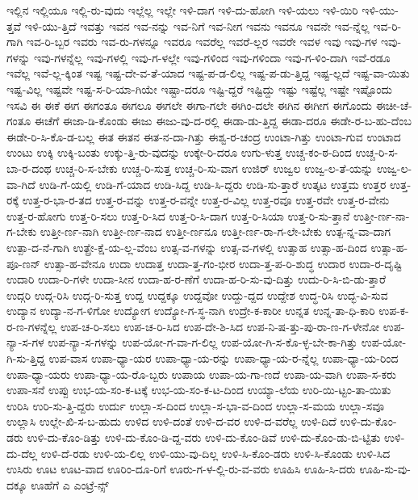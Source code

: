 {ಇಲ್ಲಿನ
ಇಲ್ಲಿಯೂ
ಇಲ್ಲಿ-ರು-ವುದು
ಇಲ್ಲೆಲ್ಲ
ಇಲ್ಲೇ
ಇಳಿ-ದಾಗ
ಇಳಿ-ದು-ಹೋಗಿ
ಇಳಿ-ಯಲು
ಇಳಿ-ಯಿರಿ
ಇಳಿ-ಯು-ತ್ತವೆ
ಇಳಿ-ಯು-ತ್ತಿದೆ
ಇವತ್ತು
ಇವನ
ಇವ-ನನ್ನು
ಇವ-ನಿಗೆ
ಇವ-ನೀಗ
ಇವನು
ಇವನೂ
ಇವನೇ
ಇವ-ನ್ನೆಲ್ಲ
ಇವ-ರಿ-ಗಾಗಿ
ಇವ-ರಿ-ಬ್ಬರ
ಇವರು
ಇವ-ರು-ಗಳನ್ನೂ
ಇವರೂ
ಇವರೆಲ್ಲ
ಇವರೆ-ಲ್ಲರ
ಇವರೇ
ಇವಳ
ಇವು
ಇವು-ಗಳ
ಇವು-ಗಳನ್ನು
ಇವು-ಗಳನ್ನೆಲ್ಲ
ಇವು-ಗಳಲ್ಲಿ
ಇವು-ಗ-ಳಲ್ಲೇ
ಇವು-ಗಳಿಂದ
ಇವು-ಗಳಿಂದಾ
ಇವು-ಗ-ಳಿಂ-ದಾಗಿ
ಇವೆ-ರಡೂ
ಇವೆಲ್ಲ
ಇವೆ-ಲ್ಲ-ಕ್ಕಿಂತ
ಇಷ್ಟ
ಇಷ್ಟ-ದೇ-ವ-ತೆ-ಯಾದ
ಇಷ್ಟ-ಪ-ಡ-ಲಿಲ್ಲ
ಇಷ್ಟ-ಪ-ಡು-ತ್ತಿದ್ದ
ಇಷ್ಟ-ಲ್ಲದೆ
ಇಷ್ಟ-ವಾ-ಯಿತು
ಇಷ್ಟ-ವಿಲ್ಲ
ಇಷ್ಟವೇ
ಇಷ್ಟ-ಸ-ರಿ-ಯಾ-ಗಿಯೇ
ಇಷ್ಟಾ-ದರೂ
ಇಷ್ಟಿ-ದ್ದರೆ
ಇಷ್ಟಿದ್ದು
ಇಷ್ಟು
ಇಷ್ಟೆಲ್ಲ
ಇಷ್ಟೇ
ಇಷ್ಟೊಂದು
ಇಸವಿ
ಈ
ಈಕೆ
ಈಗ
ಈಗಂತೂ
ಈಗಲೂ
ಈಗಲೇ
ಈಗಾ-ಗಲೇ
ಈಗಿಂ-ದಲೇ
ಈಗಿನ
ಈಗೀಗ
ಈಗೊಂದು
ಈಚೀ-ಚೆ-ಗಂತೂ
ಈಚೆಗೆ
ಈಜಾ-ಡಿ-ಕೊಂಡು
ಈಜು
ಈಜು-ವು-ದ-ರಲ್ಲಿ
ಈಡಾ-ಡು-ತ್ತಿದ್ದ
ಈಡಾ-ದರೂ
ಈಡೇ-ರ-ಬ-ಹು-ದೆಂಬ
ಈಡೇ-ರಿ-ಸಿ-ಕೊ-ಡ-ಬಲ್ಲ
ಈತ
ಈತನ
ಈತ-ನ-ದಾ-ಗಿತ್ತು
ಈಶ್ವ-ರ-ಚಂದ್ರ
ಉಂಟಾ-ಗಿತ್ತು
ಉಂಟಾ-ಗುವ
ಉಂಟಾದ
ಉಂಟು
ಉಕ್ಕಿ
ಉಕ್ಕಿ-ಬಂತು
ಉಕ್ಕು-ತ್ತಿ-ರು-ವುದನ್ನು
ಉಕ್ಕೇ-ರಿ-ದರೂ
ಉಗು-ಳುತ್ತ
ಉಚ್ಚ-ಕಂ-ಠ-ದಿಂದ
ಉಚ್ಚ-ರಿ-ಸ-ಬಾ-ರ-ದಂಥ
ಉಚ್ಚ-ರಿ-ಸ-ಬೇಕು
ಉಚ್ಚ-ರಿ-ಸುತ್ತ
ಉಚ್ಚ-ರಿ-ಸು-ವಾಗ
ಉಜಿರ್
ಉಜ್ವಲ
ಉಜ್ವ-ಲ-ತೆ-ಯನ್ನು
ಉಜ್ವ-ಲ-ವಾ-ಗಿದೆ
ಉಡಿ-ಗೆ-ಯಲ್ಲಿ
ಉಡಿ-ಗೆ-ಯಾದ
ಉಡಿ-ಸಿದ್ದ
ಉಡಿ-ಸಿ-ದ್ದರು
ಉಡಿ-ಸು-ತ್ತಾರೆ
ಉತ್ಕಟ
ಉತ್ತಮ
ಉತ್ತರ
ಉತ್ತ-ರಕ್ಕೆ
ಉತ್ತ-ರ-ಭಾ-ರ-ತದ
ಉತ್ತ-ರ-ವನ್ನು
ಉತ್ತ-ರ-ವನ್ನೇ
ಉತ್ತ-ರ-ವಿಲ್ಲ
ಉತ್ತ-ರವೂ
ಉತ್ತ-ರವೇ
ಉತ್ತ-ರ-ವೇನು
ಉತ್ತ-ರ-ಹೋಗು
ಉತ್ತ-ರಿ-ಸಲು
ಉತ್ತ-ರಿ-ಸಿದ
ಉತ್ತ-ರಿ-ಸಿ-ದಾಗ
ಉತ್ತ-ರಿ-ಸಿಯಾ
ಉತ್ತ-ರಿ-ಸು-ತ್ತಾನೆ
ಉತ್ತೀ-ರ್ಣ-ನಾ-ಗ-ಬೇಕು
ಉತ್ತೀ-ರ್ಣ-ನಾಗಿ
ಉತ್ತೀ-ರ್ಣ-ನಾದ
ಉತ್ತೀ-ರ್ಣನೂ
ಉತ್ತೀ-ರ್ಣ-ರಾ-ಗ-ಲೇ-ಬೇಕು
ಉತ್ಪ-ನ್ನ-ವಾ-ದಾಗ
ಉತ್ಪಾ-ದ-ನೆ-ಗಾಗಿ
ಉತ್ಪ್ರೇ-ಕ್ಷೆ-ಯ-ಲ್ಲ-ವೆಂಬ
ಉತ್ಸ-ವ-ಗಳನ್ನು
ಉತ್ಸ-ವ-ಗಳಲ್ಲಿ
ಉತ್ಸಾಹ
ಉತ್ಸಾ-ಹ-ದಿಂದ
ಉತ್ಸಾ-ಹ-ಪೂ-ಣನ್
ಉತ್ಸಾ-ಹ-ವೇನೂ
ಉದಾ
ಉದಾತ್ತ
ಉದಾ-ತ್ತ-ಗಂ-ಭೀರ
ಉದಾ-ತ್ತ-ಪ-ರಿ-ಶುದ್ಧ
ಉದಾರ
ಉದಾ-ರ-ದೃಷ್ಟಿ
ಉದಾರಿ
ಉದಾ-ರಿ-ಗಳೇ
ಉದಾ-ಸೀನ
ಉದಾ-ಹ-ರ-ಣೆಗೆ
ಉದಾ-ಹ-ರಿ-ಸು-ವು-ದಿತ್ತು
ಉದು-ರಿ-ಸಿ-ಬಿ-ಡು-ತ್ತಾರೆ
ಉದ್ಗರಿ
ಉದ್ಗ-ರಿಸಿ
ಉದ್ಗ-ರಿ-ಸುತ್ತ
ಉದ್ದ
ಉದ್ದಕ್ಕೂ
ಉದ್ದವೋ
ಉದ್ದು-ದ್ದದ
ಉದ್ದೇಶ
ಉದ್ಧ-ರಿಸಿ
ಉದ್ಭ-ವಿ-ಸುವ
ಉದ್ಯಾನ
ಉದ್ಯಾ-ನ-ಗ-ಳಿಗೋ
ಉದ್ಯೋಗ
ಉದ್ಯೋ-ಗ-ಸ್ಥ-ನಾಗಿ
ಉದ್ರೇ-ಕ-ಕಾರೀ
ಉನ್ನತ
ಉನ್ನ-ತಾ-ಧಿ-ಕಾರಿ
ಉಪ-ಕ-ರ-ಣ-ಗಳನ್ನೆಲ್ಲ
ಉಪ-ಚ-ರಿ-ಸಲು
ಉಪ-ಚ-ರಿ-ಸಿದ
ಉಪ-ದೇ-ಶಿ-ಸಿದ
ಉಪ-ನಿ-ಷ-ತ್ತು-ಪು-ರಾ-ಣ-ಗ-ಳೇನೋ
ಉಪ-ನ್ಯಾ-ಸ-ಗಳ
ಉಪ-ನ್ಯಾ-ಸ-ಗಳನ್ನು
ಉಪ-ಯೋ-ಗ-ವಾ-ಗ-ಲಿಲ್ಲ
ಉಪ-ಯೋ-ಗಿ-ಸ-ಕೊ-ಳ್ಳ-ಬೇ-ಕಾ-ಗಿತ್ತು
ಉಪ-ಯೋ-ಗಿ-ಸು-ತ್ತಿದ್ದ
ಉಪ-ವಾಸ
ಉಪಾ-ಧ್ಯಾ-ಯರ
ಉಪಾ-ಧ್ಯಾ-ಯ-ರನ್ನು
ಉಪಾ-ಧ್ಯಾ-ಯ-ರ-ನ್ನೆಲ್ಲ
ಉಪಾ-ಧ್ಯಾ-ಯ-ರಿಂದ
ಉಪಾ-ಧ್ಯಾ-ಯರು
ಉಪಾ-ಧ್ಯಾ-ಯ-ರೊ-ಬ್ಬರು
ಉಪಾಯ
ಉಪಾ-ಯ-ಗಾ-ಣದೆ
ಉಪಾ-ಯ-ವಾಗಿ
ಉಪಾ-ಸ-ಕರು
ಉಪಾ-ಸನೆ
ಉಪ್ಪು
ಉಭ-ಯ-ಸಂ-ಕ-ಟಕ್ಕೆ
ಉಭ-ಯ-ಸಂ-ಕ-ಟ-ದಿಂದ
ಉಯ್ಯಾ-ಲೆಯ
ಉರಿ-ಯಿ-ಟ್ಟಂ-ತಾ-ಯಿತು
ಉರಿಸಿ
ಉರಿ-ಸು-ತ್ತಿ-ದ್ದರು
ಉರ್ದು
ಉಲ್ಲಾ-ಸ-ದಿಂದ
ಉಲ್ಲಾ-ಸ-ಭಾ-ವ-ದಿಂದ
ಉಲ್ಲಾ-ಸ-ಮಯ
ಉಲ್ಲಾ-ಸವೂ
ಉಲ್ಲಾಸಿ
ಉಲ್ಲೇ-ಖಿ-ಸ-ಬ-ಹುದು
ಉಳಿದ
ಉಳಿ-ದಂತೆ
ಉಳಿ-ದ-ವರ
ಉಳಿ-ದ-ವರೆಲ್ಲ
ಉಳಿ-ದಿದೆ
ಉಳಿ-ದು-ಕೊಂ-ಡರು
ಉಳಿ-ದು-ಕೊಂ-ಡಿತ್ತು
ಉಳಿ-ದು-ಕೊಂ-ಡಿ-ದ್ದ-ವರು
ಉಳಿ-ದು-ಕೊಂ-ಡಿವೆ
ಉಳಿ-ದು-ಕೊಂ-ಡು-ಬಿ-ಟ್ಟಿತು
ಉಳಿ-ದು-ದೆಲ್ಲ
ಉಳಿ-ದೆ-ರಡು
ಉಳಿ-ಯ-ಲಿಲ್ಲ
ಉಳಿ-ಯು-ವು-ದಿಲ್ಲ
ಉಳಿ-ಸಿ-ಕೊಂ-ಡರು
ಉಳಿ-ಸಿ-ಕೊಂಡು
ಉಳಿ-ಸಿದ
ಉಸಿರು
ಊಟ
ಊಟ-ವಾದ
ಊರಿಂ-ದೂ-ರಿಗೆ
ಊರು-ಗ-ಳ-ಲ್ಲಿ-ರು-ವ-ವರು
ಊಹಿಸಿ
ಊಹಿ-ಸಿ-ದರು
ಊಹಿ-ಸು-ವು-ದಕ್ಕೂ
ಊಹೆಗೆ
ಎ
ಎಂಟ್ರೆ-ನ್ಸ್
}

